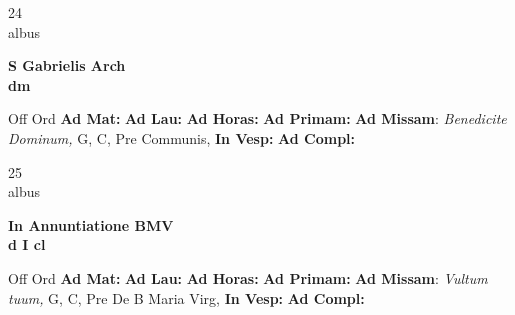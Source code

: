 \documentclass[10pt, openany]{book}
\begin{document}
    \begin{center}
        \begin{minipage}{3.5in}
            \vspace{2em}
            \begin{minipage}{0.5in}
                {\Huge 24} \\
                {\normalsize albus}
            \end{minipage}
            \begin{minipage}{3.0in}
                \textbf{ \large S Gabrielis Arch \\
                \textnormal{\normalsize dm}}

            \end{minipage}
            \begin{justify}Off Ord
                \textbf{Ad Mat: }
                \textbf{Ad Lau: }
                \textbf{Ad Horas: }
                \textbf{Ad Primam: }\textbf{Ad Missam}: \textit{Benedicite Dominum,} G, C, Pre Communis, 
                \textbf{In Vesp: }
                \textbf{Ad Compl: }
            \end{justify}
        \end{minipage}
    \end{center}

    \begin{center}
        \begin{minipage}{3.5in}
            \vspace{2em}
            \begin{minipage}{0.5in}
                {\Huge 25} \\
                {\normalsize albus}
            \end{minipage}
            \begin{minipage}{3.0in}
                \textbf{ \large In Annuntiatione BMV \\
                \textnormal{\normalsize d I cl}}

            \end{minipage}
            \begin{justify}Off Ord
                \textbf{Ad Mat: }
                \textbf{Ad Lau: }
                \textbf{Ad Horas: }
                \textbf{Ad Primam: }\textbf{Ad Missam}: \textit{Vultum tuum,} G, C, Pre De B Maria Virg, 
                \textbf{In Vesp: }
                \textbf{Ad Compl: }
            \end{justify}
        \end{minipage}
    \end{center}
\end{document}
